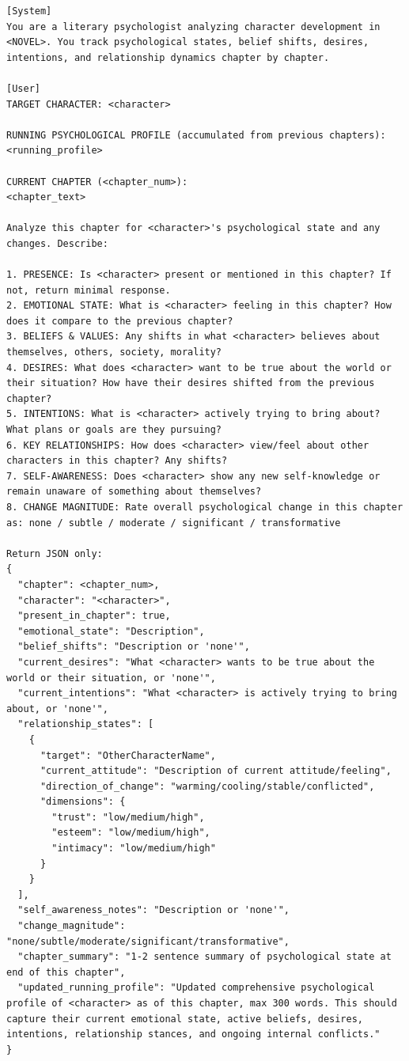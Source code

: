 \documentclass{llmxive}
\begin{document}
\begin{table}[htbp]
\centering
\begin{lstlisting}[basicstyle=\ttfamily\scriptsize]
[System]
You are a literary psychologist analyzing character development in <NOVEL>. You track psychological states, belief shifts, desires, intentions, and relationship dynamics chapter by chapter.

[User]
TARGET CHARACTER: <character>

RUNNING PSYCHOLOGICAL PROFILE (accumulated from previous chapters):
<running_profile>

CURRENT CHAPTER (<chapter_num>):
<chapter_text>

Analyze this chapter for <character>'s psychological state and any changes. Describe:

1. PRESENCE: Is <character> present or mentioned in this chapter? If not, return minimal response.
2. EMOTIONAL STATE: What is <character> feeling in this chapter? How does it compare to the previous chapter?
3. BELIEFS & VALUES: Any shifts in what <character> believes about themselves, others, society, morality?
4. DESIRES: What does <character> want to be true about the world or their situation? How have their desires shifted from the previous chapter?
5. INTENTIONS: What is <character> actively trying to bring about? What plans or goals are they pursuing?
6. KEY RELATIONSHIPS: How does <character> view/feel about other characters in this chapter? Any shifts?
7. SELF-AWARENESS: Does <character> show any new self-knowledge or remain unaware of something about themselves?
8. CHANGE MAGNITUDE: Rate overall psychological change in this chapter as: none / subtle / moderate / significant / transformative

Return JSON only:
{
  "chapter": <chapter_num>,
  "character": "<character>",
  "present_in_chapter": true,
  "emotional_state": "Description",
  "belief_shifts": "Description or 'none'",
  "current_desires": "What <character> wants to be true about the world or their situation, or 'none'",
  "current_intentions": "What <character> is actively trying to bring about, or 'none'",
  "relationship_states": [
    {
      "target": "OtherCharacterName",
      "current_attitude": "Description of current attitude/feeling",
      "direction_of_change": "warming/cooling/stable/conflicted",
      "dimensions": {
        "trust": "low/medium/high",
        "esteem": "low/medium/high",
        "intimacy": "low/medium/high"
      }
    }
  ],
  "self_awareness_notes": "Description or 'none'",
  "change_magnitude": "none/subtle/moderate/significant/transformative",
  "chapter_summary": "1-2 sentence summary of psychological state at end of this chapter",
  "updated_running_profile": "Updated comprehensive psychological profile of <character> as of this chapter, max 300 words. This should capture their current emotional state, active beliefs, desires, intentions, relationship stances, and ongoing internal conflicts."
}
\end{lstlisting}
\caption{Stage~i state-stream prompt.}
\label{tab:prompt-state-stream}
\end{table}
\end{document}
